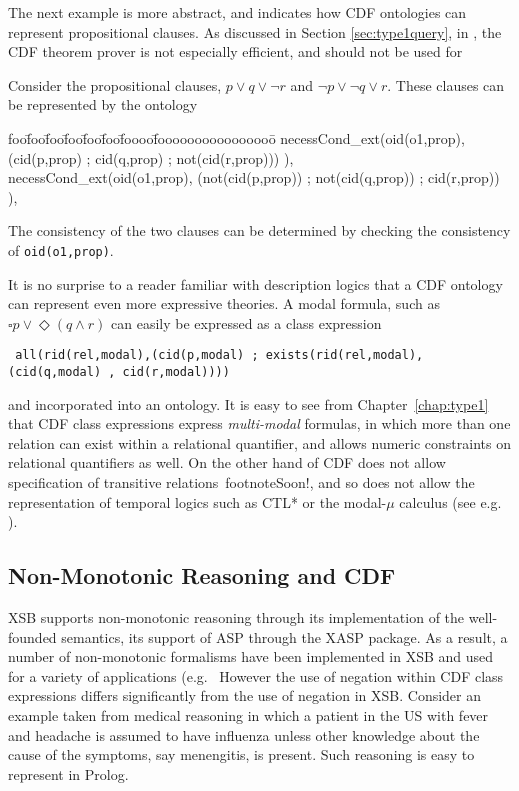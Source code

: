 The next example is more abstract, and indicates how CDF ontologies
can represent propositional clauses.  As discussed in Section
\ref{sec:type1query}, in \version, the CDF theorem prover is not
especially efficient, and should not be used for

\begin{example} \rm
Consider the propositional clauses, $p \vee q \vee \neg r$ and $\neg p
\vee \neg q \vee r$.  These clauses can be represented by the ontology
{\tt  {\small 
\begin{tabbing} foo\=foo\=foo\=foo\=foo\=foo\=foooo\=foooooooooooooooo\=\kill
\> necessCond\_ext(oid(o1,prop), 
	(cid(p,prop) ; cid(q,prop) ; not(cid(r,prop))) ), \\
\> necessCond\_ext(oid(o1,prop), 
	(not(cid(p,prop)) ; not(cid(q,prop)) ; cid(r,prop)) ), \\
\end{tabbing} }}
The consistency of the two clauses can be determined by checking the
consistency of {\tt oid(o1,prop)}.
\end{example}

It is no surprise to a reader familiar with description logics that a
CDF ontology can represent even more expressive theories. A modal
formula, such as $\square p \vee \Diamond (q \wedge r)$ can easily be
expressed as a class expression

{\small {\tt 
all(rid(rel,modal),(cid(p,modal) ; exists(rid(rel,modal),(cid(q,modal) , cid(r,modal)))) } }

and incorporated into an ontology.  It is easy to see from
Chapter~\ref{chap:type1} that CDF class expressions express {\em
  multi-modal} formulas, in which more than one relation can exist
within a relational quantifier, and allows numeric constraints on
relational quantifiers as well.  On the other hand \version{} of CDF
does not allow specification of transitive relations~footnote{Soon!},
and so does not allow the representation of temporal logics such as
CTL* or the modal-$\mu$ calculus (see e.g. \cite{Stir94}).

\subsection{Non-Monotonic Reasoning and CDF}

XSB supports non-monotonic reasoning through its implementation of the
well-founded semantics, its support of ASP through the XASP package.
As a result, a number of non-monotonic formalisms have been
implemented in XSB and used for a variety of applications
(e.g.~\cite{Swif99a,CuSw02,AlPS03} However the use of negation within
CDF class expressions differs significantly from the use of negation
in XSB.  Consider an example taken from medical reasoning in which a
patient in the US with fever and headache is assumed to have influenza
unless other knowledge about the cause of the symptoms, say
menengitis, is present.  Such reasoning is easy to represent in
Prolog.

